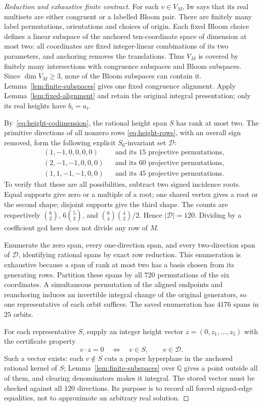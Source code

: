 \documentclass[11pt]{article}
\theoremstyle{remark}
\begin{document}
\begin{proof}[Reduction and exhaustive finite contract]
For each $v\in V_M$, Iw says that its real multisets are either congruent
or a labelled Bloom pair. There are finitely many label permutations,
orientations and choices of origin. Each fixed Bloom choice defines a
linear subspace of the anchored ten-coordinate space of dimension at
most two: all coordinates are fixed integer-linear combinations of
its two parameters, and anchoring removes the translations. Thus $V_M$
is covered by finitely many intersections with congruence subspaces and
Bloom subspaces. Since $\dim V_M\ge3$, none of the Bloom subspaces can
contain it. Lemma~\ref{lem:finite-subspaces} gives one fixed congruence
alignment. Apply Lemma~\ref{lem:fixed-alignment} and retain the original
integral presentation; only its real heights have $b_i=a_i$.

By~\eqref{eq:height-codimension}, the rational height span $S$ has
rank at most two. The primitive directions of all nonzero rows
\eqref{eq:height-rows}, with an overall sign removed, form the following
explicit $S_6$-invariant set $\mathcal D$:
\begin{align*}
 &(1,-1,0,0,0,0) &&\text{and its $15$ projective permutations},\\
 &(2,-1,-1,0,0,0) &&\text{and its $60$ projective permutations},\\
 &(1,1,-1,-1,0,0) &&\text{and its $45$ projective permutations}.
\end{align*}
To verify that these are all possibilities, subtract two signed
incidence roots. Equal supports give zero or a multiple of a root;
one shared vertex gives a root or the second shape; disjoint supports
give the third shape. The counts are respectively $\binom62$,
$6\binom52$, and $\binom64\binom42/2$. Hence $|\mathcal D|=120$.
Dividing by a coefficient gcd here does not divide any row of $M$.

Enumerate the zero span, every one-direction span, and every two-direction
span of $\mathcal D$, identifying rational spans by exact row reduction.
This enumeration is exhaustive because a span of rank at most two has
a basis chosen from its generating rows. Partition these spans by all
$720$ permutations of the six coordinates. A simultaneous permutation
of the aligned endpoints and reanchoring induces an invertible integral
change of the original generators, so one representative of each orbit
suffices. The saved enumeration has $4176$ spans in $25$ orbits.

For each representative $S$, supply an integer height vector
$z=(0,z_1,\ldots,z_5)$ with the certificate property
\begin{equation}\label{eq:generic-height-contract}
 v\cdot z=0\quad\Longleftrightarrow\quad v\in S,
 \qquad v\in\mathcal D.
\end{equation}
Such a vector exists: each $v\notin S$ cuts a proper hyperplane in the
anchored rational kernel of $S$; Lemma~\ref{lem:finite-subspaces} over
$\mathbb Q$ gives a point outside all of them, and clearing denominators
makes it integral. The stored vector must be checked against all $120$
directions. Its purpose is to record all forced signed-edge equalities,
not to approximate an arbitrary real solution.


\end{proof}
\end{document}
